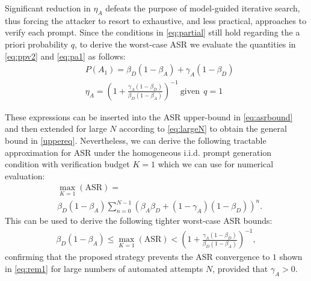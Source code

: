 \documentclass[conference,compsoc]{IEEEtran}
\begin{document}
Significant reduction in $\eta_A$ defeats the purpose of model-guided iterative search, thus forcing the attacker to resort to exhaustive, and less practical, approaches to verify each prompt.
Since the conditions in \eqref{eq:partial} still hold regarding the a priori probability $q$, to derive the worst-case ASR we evaluate the quantities in \eqref{eq:ppv2} and \eqref{eq:pa1} as follows:
\begin{align}
    &P(A_1) = \beta_D(1-\beta_A) + \gamma_A(1-\beta_D) \label{eq:pa1q1}\\[8pt]
    &\eta_A =  \left(1+\frac{\gamma_A(1-\beta_D)}{\beta_D(1-\beta_A)}\right)^{-1} \label{eq:ppvq1} ~\mathrm{given}~~ q = 1
\end{align}

These expressions can be inserted into the ASR upper-bound in \eqref{eq:asrbound} and then extended for large $N$ according to \eqref{eq:largeN} to obtain the general bound in \eqref{uppereq}.
Nevertheless, we can derive the following tractable approximation for ASR under the homogeneous i.i.d. prompt generation condition with verification budget $K=1$ which we can use for numerical evaluation:
\begin{align}\label{eq:asrmax}
    &\max_{K=1}(\mathrm{ASR}) = \\\nonumber
    &\beta_D(1-\beta_A)\sum_{n=0}^{N-1}(\beta_A\beta_D+(1-\gamma_A)(1-\beta_D))^n.
\end{align}
This can be used to derive the following tighter worst-case ASR bounds:
\begin{align}\label{eq:asrbound}
    \beta_D(1-\beta_A)\le \max_{K=1}(\mathrm{ASR}) < \left(1+\frac{\gamma_A(1-\beta_D)}{\beta_D(1-\beta_A)}\right)^{-1},
\end{align}
confirming that the proposed strategy prevents the ASR convergence to $1$ shown in \eqref{eq:rem1} for large numbers of automated attempts $N$, provided that $\gamma_A > 0$.
\end{document}
